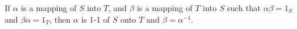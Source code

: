 If $\alpha$ is a mapping of $S$ into $T$, and $\beta$ is a mapping of $T$ into $S$ such that $\alpha\beta = 1_S$ and $\beta\alpha = 1_T$, then $\alpha$ is 1-1 of $S$ onto $T$ and $\beta = \alpha^{-1}$.
